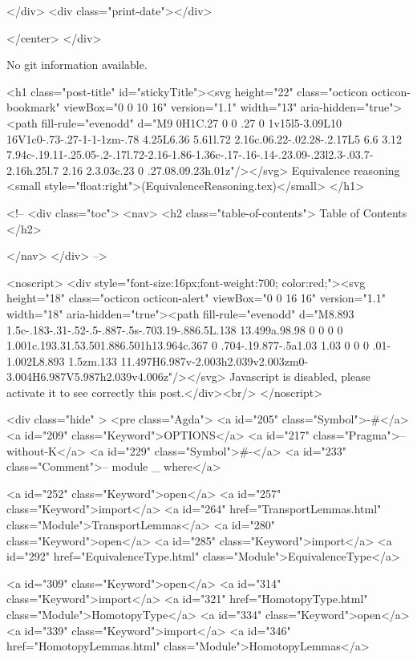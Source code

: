           
        </div>
        <div class="print-date"></div>
        
        
    </center>
  </div>

  
  No git information available.
  

  <h1 class="post-title" id="stickyTitle"><svg height="22" class="octicon octicon-bookmark" viewBox="0 0 10 16" version="1.1" width="13" aria-hidden="true"><path fill-rule="evenodd" d="M9 0H1C.27 0 0 .27 0 1v15l5-3.09L10 16V1c0-.73-.27-1-1-1zm-.78 4.25L6.36 5.61l.72 2.16c.06.22-.02.28-.2.17L5 6.6 3.12 7.94c-.19.11-.25.05-.2-.17l.72-2.16-1.86-1.36c-.17-.16-.14-.23.09-.23l2.3-.03.7-2.16h.25l.7 2.16 2.3.03c.23 0 .27.08.09.23h.01z"/></svg> Equivalence reasoning <small style="float:right">(EquivalenceReasoning.tex)</small>
  </h1>

  <!-- 
  <div class="toc">
    <nav>
    <h2 class="table-of-contents"> Table of Contents </h2>
      

    </nav>
  </div>
   -->

  <noscript>
  <div style="font-size:16px;font-weight:700; color:red;"><svg height="18" class="octicon octicon-alert" viewBox="0 0 16 16" version="1.1" width="18" aria-hidden="true"><path fill-rule="evenodd" d="M8.893 1.5c-.183-.31-.52-.5-.887-.5s-.703.19-.886.5L.138 13.499a.98.98 0 0 0 0 1.001c.193.31.53.501.886.501h13.964c.367 0 .704-.19.877-.5a1.03 1.03 0 0 0 .01-1.002L8.893 1.5zm.133 11.497H6.987v-2.003h2.039v2.003zm0-3.004H6.987V5.987h2.039v4.006z"/></svg> Javascript is disabled, please activate it to see correctly this post.</div><br/>
  </noscript>

  <div class="hide" >
<pre class="Agda">
<a id="205" class="Symbol">{-#</a> <a id="209" class="Keyword">OPTIONS</a> <a id="217" class="Pragma">--without-K</a> <a id="229" class="Symbol">#-}</a>
<a id="233" class="Comment">-- module _ where</a>

<a id="252" class="Keyword">open</a> <a id="257" class="Keyword">import</a> <a id="264" href="TransportLemmas.html" class="Module">TransportLemmas</a>
<a id="280" class="Keyword">open</a> <a id="285" class="Keyword">import</a> <a id="292" href="EquivalenceType.html" class="Module">EquivalenceType</a>

<a id="309" class="Keyword">open</a> <a id="314" class="Keyword">import</a> <a id="321" href="HomotopyType.html" class="Module">HomotopyType</a>
<a id="334" class="Keyword">open</a> <a id="339" class="Keyword">import</a> <a id="346" href="HomotopyLemmas.html" class="Module">HomotopyLemmas</a>

